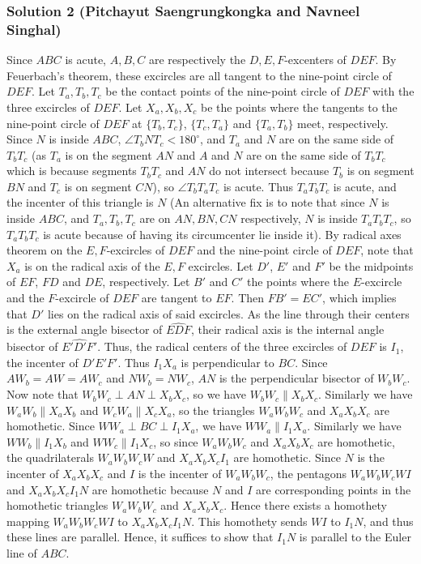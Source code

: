 \subsubsection{Solution 2 (Pitchayut Saengrungkongka and Navneel Singhal)}
Since $ABC$ is acute, $A, B, C$ are respectively the $D, E, F$-excenters of $DEF$. By Feuerbach's theorem, these excircles are all tangent to the nine-point circle of $DEF$. Let $T_a, T_b, T_c$ be the contact points of the nine-point circle of $DEF$ with the three excircles of $DEF$. Let $X_a, X_b, X_c$ be the points where the tangents to the nine-point circle of $DEF$ at $\{T_b, T_c\}$, $\{T_c, T_a\}$ and $\{T_a, T_b\}$ meet, respectively. \nl
Since $N$ is inside $ABC$, $\angle T_bNT_c < 180^\circ$, and $T_a$ and $N$ are on the same side of $T_bT_c$ (as $T_a$ is on the segment $AN$ and $A$ and $N$ are on the same side of $T_bT_c$ which is because segments $T_bT_c$ and $AN$ do not intersect because $T_b$ is on segment $BN$ and $T_c$ is on segment $CN$), so $\angle T_bT_aT_c$ is acute. Thus $T_aT_bT_c$ is acute, and the incenter of this triangle is $N$ (An alternative fix is to note that since $N$ is inside $ABC$, and $T_a, T_b, T_c$ are on $AN, BN, CN$ respectively, $N$ is inside $T_aT_bT_c$, so $T_aT_bT_c$ is acute because of having its circumcenter lie inside it). By radical axes theorem on the $E, F$-excircles of $DEF$ and the nine-point circle of $DEF$, note that $X_a$ is on the radical axis of the $E, F$ excircles.\nl
Let $D'$, $E'$ and $F'$ be the midpoints of $EF$, $FD$ and $DE$, respectively. Let $B'$ and $C'$ the points where the $E$-excircle and the $F$-excircle of $DEF$ are tangent to $EF$. Then $FB'=EC'$, which implies that $D'$ lies on the radical axis of said excircles. As the line through their centers is the external angle bisector of $\widehat{EDF}$, their radical axis is the internal angle bisector of $\widehat{E'D'F'}$. Thus, the radical centers of the three excircles of $DEF$ is $I_1$, the incenter of $D'E'F'$. Thus $I_1X_a$ is perpendicular to $BC$.\nl
Since $AW_b = AW = AW_c$ and $NW_b = NW_c$, $AN$ is the perpendicular bisector of $W_bW_c$. Now note that $W_bW_c \perp AN \perp X_bX_c$, so we have $W_bW_c \parallel X_bX_c$. Similarly we have $W_aW_b \parallel X_aX_b$ and $W_cW_a \parallel X_cX_a$, so the triangles $W_aW_bW_c$ and $X_aX_bX_c$ are homothetic. Since $WW_a \perp BC \perp I_1X_a$, we have $WW_a \parallel I_1X_a$. Similarly we have $WW_b \parallel I_1X_b$ and $WW_c \parallel I_1X_c$, so since $W_aW_bW_c$ and $X_aX_bX_c$ are homothetic, the quadrilaterals $W_aW_bW_cW$ and $X_aX_bX_cI_1$ are homothetic. Since $N$ is the incenter of $X_aX_bX_c$ and $I$ is the incenter of $W_aW_bW_c$, the pentagons $W_aW_bW_cWI$ and $X_aX_bX_cI_1N$ are homothetic because $N$ and $I$ are corresponding points in the homothetic triangles $W_aW_bW_c$ and $X_aX_bX_c$. Hence there exists a homothety mapping $W_aW_bW_cWI$ to $X_aX_bX_cI_1N$. This homothety sends $WI$ to $I_1N$, and thus these lines are parallel. Hence, it suffices to show that $I_1N$ is parallel to the Euler line of $ABC$.\nl
